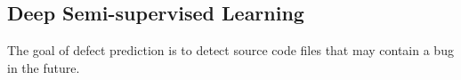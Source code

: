 

\subsection{Deep Semi-supervised Learning}
\label{sec:semi}
The goal of defect prediction is to detect source code files that may contain a bug in the future. 

